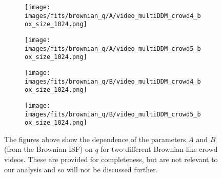 \documentclass[10pt]{article}
\begin{document}
\begin{figure}[H]
\begin{subfigure}[t]{.5\textwidth}
  \centering
  \texttt{[image: images/fits/brownian\_q/A/video\_multiDDM\_crowd4\_box\_size\_1024.png]}
  \caption{}
\end{subfigure}%
\hfill
\begin{subfigure}[t]{.5\textwidth}
  \centering
  \texttt{[image: images/fits/brownian\_q/A/video\_multiDDM\_crowd5\_box\_size\_1024.png]}
  \caption{}
\end{subfigure}
\label{fig:crowd_brownian_fits_A}
\par\bigskip
\begin{subfigure}[t]{.5\textwidth}
  \centering
  \texttt{[image: images/fits/brownian\_q/B/video\_multiDDM\_crowd4\_box\_size\_1024.png]}
  \caption{}
\end{subfigure}%
\hfill
\begin{subfigure}[t]{.5\textwidth}
  \centering
  \texttt{[image: images/fits/brownian\_q/B/video\_multiDDM\_crowd5\_box\_size\_1024.png]}
  \caption{}
\end{subfigure}
\caption{The figures above show the dependence of the parameters $A$ and $B$ (from the Brownian ISF) on $q$ for two different Brownian-like crowd videos. These are provided for completeness, but are not relevant to our analysis and so will not be discussed further.}
\label{fig:crowd_brownian_fits_B}
\end{figure}
\end{document}
